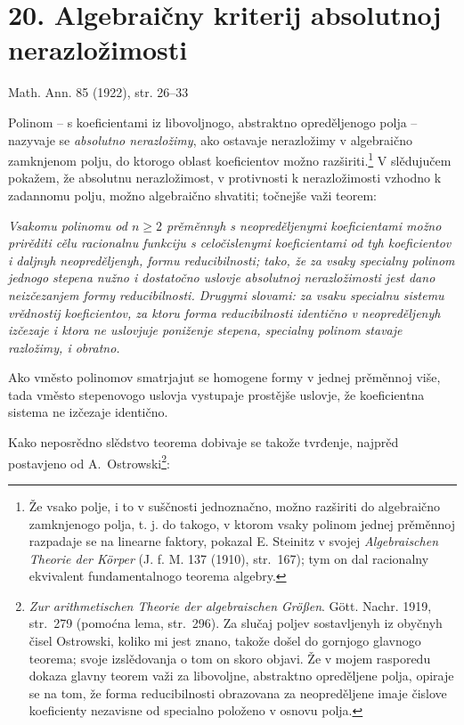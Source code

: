 \documentclass[11pt]{article}
\begin{document}

\setcounter{footnote}{0}
\section*{20. Algebraičny kriterij absolutnoj nerazložimosti}
\begin{center}
Math. Ann. 85 (1922), str. 26--33
\end{center}

Polinom -- s koeficientami iz libovoljnogo, abstraktno opreděljenogo polja -- nazyvaje se \emph{absolutno nerazložimy}, ako ostavaje nerazložimy v algebraično zamknjenom polju, do ktorogo oblast koeficientov možno razširiti.\footnote{Že vsako polje, i to v suščnosti jednoznačno, možno razširiti do algebraično zamknjenogo polja, t. j. do takogo, v ktorom vsaky polinom jednej prěměnnoj razpadaje se na linearne faktory, pokazal E. Steinitz v svojej \emph{Algebraischen Theorie der Körper} (J. f. M. 137 (1910), str.~167); tym on dal racionalny ekvivalent fundamentalnogo teorema algebry.} V slědujučem pokažem, že absolutnu nerazložimost, v protivnosti k nerazložimosti vzhodno k zadannomu polju, možno algebraično shvatiti; točnejše važi teorem:

\emph{Vsakomu polinomu od $n\ge2$ prěměnnyh s neopreděljenymi koeficientami možno prirěditi cělu racionalnu funkciju s celočislenymi koeficientami od tyh koeficientov i daljnyh neopreděljenyh, formu reducibilnosti; tako, že za vsaky specialny polinom jednogo stepena nužno i dostatočno uslovje absolutnoj nerazložimosti jest dano neizčezanjem formy reducibilnosti. Drugymi slovami: za vsaku specialnu sistemu vrědnostij koeficientov, za ktoru forma reducibilnosti identično v neopreděljenyh izčezaje i ktora ne uslovjuje poniženje stepena, specialny polinom stavaje razložimy, i obratno.}

Ako vměsto polinomov smatrjajut se homogene formy v jednej prěměnnoj više, tada vměsto stepenovogo uslovja vystupaje prostějše uslovje, že koeficientna sistema ne izčezaje identično.

Kako neposrědno slědstvo teorema dobivaje se takože tvrđenje, najprěd postavjeno od \mbox{A.~Ostrowski}\footnote{\emph{Zur arithmetischen Theorie der algebraischen Größen}. Gött. Nachr. 1919, str.~279 (pomoćna lema, str.~296). Za slučaj poljev sostavljenyh iz obyčnyh čisel Ostrowski, koliko mi jest znano, takože došel do gornjogo glavnogo teorema; svoje izslědovanja o tom on skoro objavi. Že v mojem rasporedu dokaza glavny teorem važi za libovoljne, abstraktno opreděljene polja, opiraje se na tom, že forma reducibilnosti obrazovana za neopreděljene imaje čislove koeficienty nezavisne od specialno položeno v osnovu polja.}:
\end{document}
